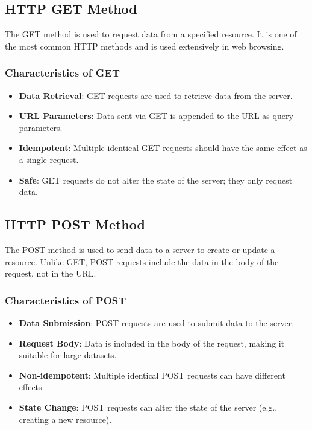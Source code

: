 \subsection{HTTP GET Method}
The GET method is used to request data from a specified resource. It is one of the most common HTTP methods and is used extensively in web browsing.

\subsubsection{Characteristics of GET}
\begin{itemize}
    \item \textbf{Data Retrieval}: GET requests are used to retrieve data from the server.
    \item \textbf{URL Parameters}: Data sent via GET is appended to the URL as query parameters.
    \item \textbf{Idempotent}: Multiple identical GET requests should have the same effect as a single request.
    \item \textbf{Safe}: GET requests do not alter the state of the server; they only request data.
\end{itemize}

\subsection{HTTP POST Method}
The POST method is used to send data to a server to create or update a resource. Unlike GET, POST requests include the data in the body of the request, not in the URL.

\subsubsection{Characteristics of POST}
\begin{itemize}
    \item \textbf{Data Submission}: POST requests are used to submit data to the server.
    \item \textbf{Request Body}: Data is included in the body of the request, making it suitable for large datasets.
    \item \textbf{Non-idempotent}: Multiple identical POST requests can have different effects.
    \item \textbf{State Change}: POST requests can alter the state of the server (e.g., creating a new resource).
\end{itemize}